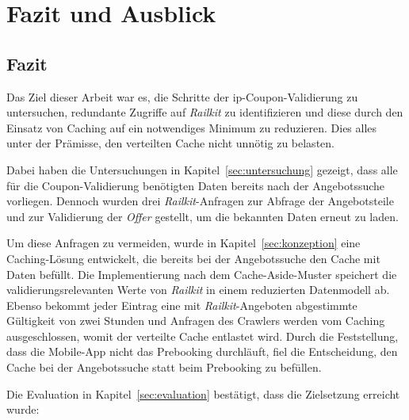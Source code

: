 \section{Fazit und Ausblick}
\label{sec:fazit}

\subsection{Fazit}
\label{subsec:fazit}

Das Ziel dieser Arbeit war es, die Schritte der \ac{ip}-Coupon-Validierung zu untersuchen, redundante Zugriffe auf \textit{Railkit} zu identifizieren und diese durch den Einsatz von Caching auf ein notwendiges Minimum zu reduzieren. Dies alles unter der Prämisse, den verteilten Cache nicht unnötig zu belasten.

Dabei haben die Untersuchungen in Kapitel~\ref{sec:untersuchung} gezeigt, dass alle für die Coupon-Validierung benötigten Daten bereits nach der Angebotssuche vorliegen. Dennoch wurden drei \textit{Railkit}-Anfragen zur Abfrage der Angebotsteile und zur Validierung der \textit{Offer} gestellt, um die bekannten Daten erneut zu laden.

Um diese Anfragen zu vermeiden, wurde in Kapitel~\ref{sec:konzeption} eine Caching-Lösung entwickelt, die bereits bei der Angebotssuche den Cache mit Daten befüllt. Die Implementierung nach dem Cache-Aside-Muster speichert die validierungsrelevanten Werte von \textit{Railkit} in einem reduzierten Datenmodell ab. Ebenso bekommt jeder Eintrag eine mit \textit{Railkit}-Angeboten abgestimmte Gültigkeit von zwei Stunden und Anfragen des Crawlers werden vom Caching ausgeschlossen, womit der verteilte Cache entlastet wird. Durch die Feststellung, dass die Mobile-App nicht das Prebooking durchläuft, fiel die Entscheidung, den Cache bei der Angebotssuche statt beim Prebooking zu befüllen.

Die Evaluation in Kapitel~\ref{sec:evaluation} bestätigt, dass die Zielsetzung erreicht wurde:

